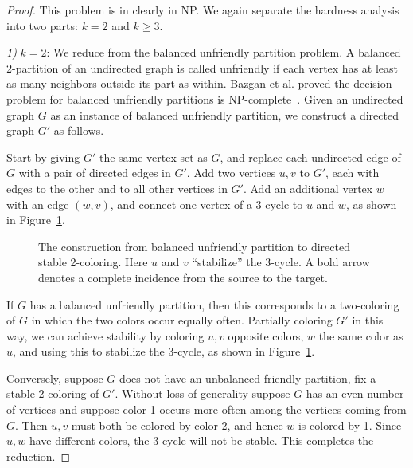 \documentclass{llncs}
\begin{document}
\begin{proof}
This problem is in clearly in NP.  We again separate the hardness analysis into two
parts: $k=2$ and $k \geq 3$. 

\noindent \emph{1)} $k=2$:
We reduce from the balanced unfriendly partition problem. A
balanced 2-partition of an undirected graph is called unfriendly 
if each vertex has at least as many neighbors outside its part as within. 
Bazgan et al. proved the decision problem for balanced unfriendly partitions 
is NP-complete~\cite{BazganTV10}. Given an undirected graph $G$ as an instance of
balanced unfriendly partition, we construct a directed graph $G'$ as follows.

Start by giving $G'$ the same vertex set as $G$, and replace each undirected
edge of $G$ with a pair of directed edges in $G'$. Add two vertices $u,v$ to
$G'$, each with edges to the other and to all other vertices in $G'$. Add an
additional vertex $w$ with an edge $(w,v)$, and connect one vertex of a 3-cycle
to $u$ and $w$, as shown in Figure~\ref{fig:weaktwocolornphard}.

\begin{figure}[htb]
\centering
{}
\caption{The construction from balanced unfriendly partition to directed stable 2-coloring. Here $u$ and $v$ ``stabilize'' the 3-cycle. A bold arrow denotes a complete incidence from the source to the target.}
\label{fig:weaktwocolornphard}
\end{figure}

If $G$ has a balanced unfriendly partition, then this corresponds to a
two-coloring of $G$ in which the two colors occur equally often. Partially
coloring $G'$ in this way, we can achieve stability by coloring $u,v$ opposite
colors, $w$ the same color as $u$, and using this to stabilize the 3-cycle,
as shown in Figure~\ref{fig:weaktwocolornphard}.

Conversely, suppose $G$ does not have an unbalanced friendly partition, fix a
stable 2-coloring of $G'$. Without loss of generality suppose $G$ has an even
number of vertices and suppose color 1 occurs more often among the vertices
coming from $G$. Then $u,v$ must both be colored by color 2, and hence $w$ is
colored by 1. Since $u,w$ have different colors, the 3-cycle will not be
stable. This completes the reduction.


\end{proof}
\end{document}
